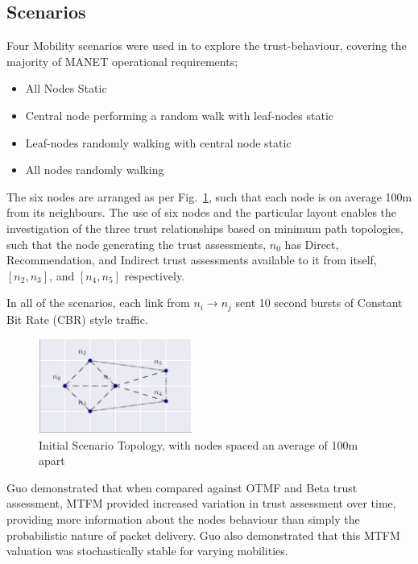 \documentclass[runningheads,a4paper]{llncs}
\begin{document}
\subsection{Scenarios}

Four Mobility scenarios were used in \cite{Guo11} to explore the trust-behaviour, covering the majority of MANET operational requirements; 

\begin{itemize}
  \item All Nodes Static
  \item Central node performing a random walk with leaf-nodes static
  \item Leaf-nodes randomly walking with central node static
  \item All nodes randomly walking
\end{itemize}

The six nodes are arranged as per Fig.~\ref{fig:s1_layout}, such that each node is on average 100m from its neighbours. 
The use of six nodes and the particular layout enables the investigation of the three trust relationships based on minimum path topologies, such that the node generating the trust assessments, $n_0$ has Direct, Recommendation, and Indirect trust assessments available to it from itself, $[n_2,n_3]$, and $[n_4,n_5]$ respectively.

In all of the scenarios, each link from $n_i \rightarrow n_j$ sent 10 second bursts of Constant Bit Rate (CBR) style traffic.

\begin{figure}[h]
  \centering
  \includegraphics[width=0.45\textwidth]{img/s1_layout.pdf}
  \caption{Initial Scenario Topology, with nodes spaced an average of 100m apart}
  \label{fig:s1_layout}
\end{figure}

Guo demonstrated that when compared against OTMF and Beta trust assessment, MTFM provided increased variation in trust assessment over time, providing more information about the nodes behaviour than simply the probabilistic nature of packet delivery. Guo also demonstrated that this MTFM valuation was stochastically stable for varying mobilities. 
\end{document}
